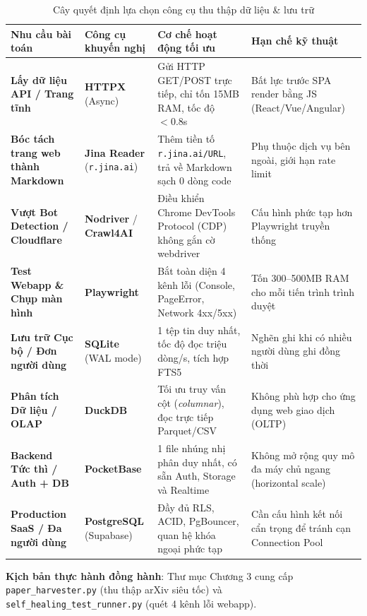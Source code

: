 \documentclass[a4paper,11pt]{report}
\begin{document}
\begin{table}[htbp]
\centering
\small
\caption{Cây quyết định lựa chọn công cụ thu thập dữ liệu \& lưu trữ}
\vspace{0.5em}
\begin{tabularx}{\textwidth}{L{2.8cm} L{3.5cm} L{4.5cm} Y}
\toprule
\textbf{Nhu cầu bài toán} & \textbf{Công cụ khuyến nghị} & \textbf{Cơ chế hoạt động tối ưu} & \textbf{Hạn chế kỹ thuật} \\
\midrule
\textbf{Lấy dữ liệu API / Trang tĩnh} & \textbf{HTTPX} (Async) & Gửi HTTP GET/POST trực tiếp, chỉ tốn 15MB RAM, tốc độ $< 0.8$s & Bất lực trước SPA render bằng JS (React/Vue/Angular) \\
\textbf{Bóc tách trang web thành Markdown} & \textbf{Jina Reader} (\texttt{r.jina.ai}) & Thêm tiền tố \texttt{r.jina.ai/URL}, trả về Markdown sạch 0 dòng code & Phụ thuộc dịch vụ bên ngoài, giới hạn rate limit \\
\textbf{Vượt Bot Detection / Cloudflare} & \textbf{Nodriver} / \textbf{Crawl4AI} & Điều khiển Chrome DevTools Protocol (CDP) không gắn cờ webdriver & Cấu hình phức tạp hơn Playwright truyền thống \\
\textbf{Test Webapp \& Chụp màn hình} & \textbf{Playwright} & Bắt toàn diện 4 kênh lỗi (Console, PageError, Network 4xx/5xx) & Tốn 300--500MB RAM cho mỗi tiến trình trình duyệt \\
\midrule
\textbf{Lưu trữ Cục bộ / Đơn người dùng} & \textbf{SQLite} (WAL mode) & 1 tệp tin duy nhất, tốc độ đọc triệu dòng/s, tích hợp FTS5 & Nghẽn ghi khi có nhiều người dùng ghi đồng thời \\
\textbf{Phân tích Dữ liệu / OLAP} & \textbf{DuckDB} & Tối ưu truy vấn cột (\textit{columnar}), đọc trực tiếp Parquet/CSV & Không phù hợp cho ứng dụng web giao dịch (OLTP) \\
\textbf{Backend Tức thì / Auth + DB} & \textbf{PocketBase} & 1 file nhúng nhị phân duy nhất, có sẵn Auth, Storage và Realtime & Không mở rộng quy mô đa máy chủ ngang (horizontal scale) \\
\textbf{Production SaaS / Đa người dùng} & \textbf{PostgreSQL} (Supabase) & Đầy đủ RLS, ACID, PgBouncer, quan hệ khóa ngoại phức tạp & Cần cấu hình kết nối cẩn trọng để tránh cạn Connection Pool \\
\bottomrule
\end{tabularx}
\end{table}

\noindent\textbf{Kịch bản thực hành đồng hành}: Thư mục Chương 3 cung cấp \texttt{paper\_harvester.py} (thu thập arXiv siêu tốc) và \texttt{self\_healing\_test\_runner.py} (quét 4 kênh lỗi webapp).
\end{document}
